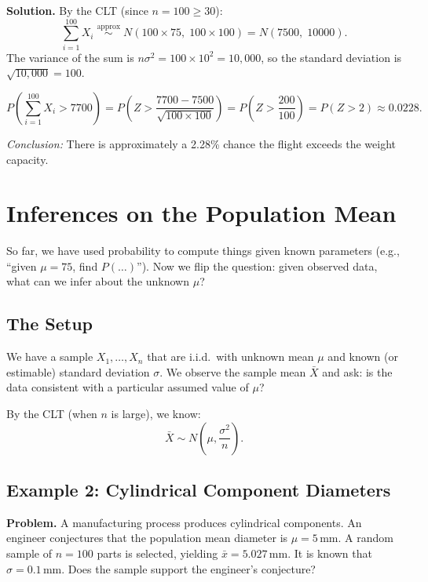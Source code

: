 \documentclass[10pt]{report}
\begin{document}
\textbf{Solution.} By the CLT (since $n = 100 \geq 30$):
\[
\sum_{i=1}^{100} X_i \;\overset{\text{approx}}{\sim}\; N\!\left(100 \times 75,\; 100 \times 100\right) = N\!\left(7500,\; 10000\right).
\]
The variance of the sum is $n\sigma^2 = 100 \times 10^2 = 10{,}000$, so the standard deviation is $\sqrt{10{,}000} = 100$.

\[
P\!\left(\sum_{i=1}^{100} X_i > 7700\right) = P\!\left(Z > \frac{7700 - 7500}{\sqrt{100 \times 100}}\right) = P\!\left(Z > \frac{200}{100}\right) = P(Z > 2) \approx \boxed{0.0228.}
\]

\textit{Conclusion:} There is approximately a 2.28\% chance the flight exceeds the weight capacity.

\bigskip

\section{Inferences on the Population Mean}

So far, we have used probability to compute things given known parameters (e.g., ``given $\mu = 75$, find $P(\ldots)$''). Now we flip the question: given observed data, what can we infer about the unknown $\mu$?

\subsection{The Setup}

We have a sample $X_1, \ldots, X_n$ that are i.i.d.\ with unknown mean $\mu$ and known (or estimable) standard deviation $\sigma$. We observe the sample mean $\bar{X}$ and ask: is the data consistent with a particular assumed value of $\mu$?

By the CLT (when $n$ is large), we know:
\[
\bar{X} \sim N\!\left(\mu, \frac{\sigma^2}{n}\right).
\]

\subsection{Example 2: Cylindrical Component Diameters}

\textbf{Problem.} A manufacturing process produces cylindrical components. An engineer conjectures that the population mean diameter is $\mu = 5\,\text{mm}$. A random sample of $n = 100$ parts is selected, yielding $\bar{x} = 5.027\,\text{mm}$. It is known that $\sigma = 0.1\,\text{mm}$. Does the sample support the engineer's conjecture?
\end{document}
